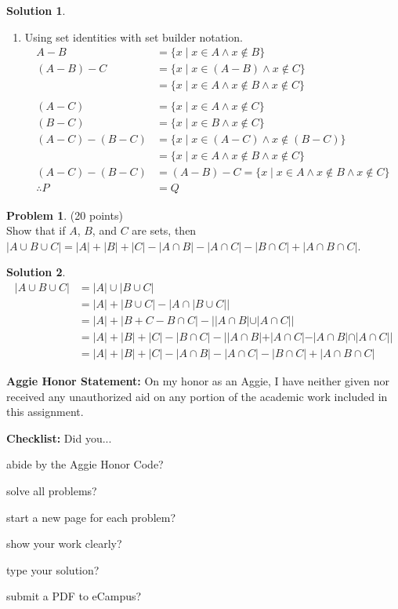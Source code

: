 \documentclass{article}
\theoremstyle{definition}
\newtheorem{problem}{Problem}
\newtheorem*{solution}{Solution}
\newcommand{\honor}{\noindent \textbf{Aggie Honor Statement: }On my honor as an Aggie, I have neither
  given nor received any unauthorized aid on any portion of the academic work included in this assignment.
}
\newcommand{\checklist}{\noindent\textbf{Checklist:}
Did you...
\begin{compactenum}
\item abide by the Aggie Honor Code?
\item solve all problems?
\item start a new page for each problem?
\item show your work clearly?
\item type your solution?
\item submit a PDF to eCampus?
\end{compactenum}
}
\begin{document}
\begin{solution}
\begin{enumerate}
    \item Using set identities with set builder notation.
      \begin{equation*}
        \begin{aligned}
          A-B            & = \{x \mid x \in A \wedge x \notin B \} \\
          (A-B) - C      & = \{x \mid x \in (A-B) \wedge x \notin C\} \\
                         & = \{x \mid x \in A \wedge x \notin B \wedge x \notin C \} \\ \ \\
          (A-C)          & = \{x \mid x \in A \wedge x \notin C \} \\
          (B-C)          & = \{x \mid x \in B \wedge x \notin C \} \\
          (A-C) - (B-C)  & = \{x \mid x \in (A-C) \wedge x \notin (B-C) \} \\
                         & = \{x \mid x \in A \wedge x \notin B \wedge x \notin C \} \\
          (A-C)-(B-C)    & = (A-B)-C = \{x \mid x \in A \wedge x \notin B \wedge x \notin C \}\\
          \therefore   P & = Q
        \end{aligned}
      \end{equation*}
  \end{enumerate}

\end{solution}

\newpage

\begin{problem} (20 points)\\
Show that if $A$, $B$, and $C$ are sets, then $|A \cup B \cup C| = |A| + |B| + |C| - |A \cap B| - |A \cap C| - |B \cap C| + |A \cap B \cap C|$.
\end{problem}

\begin{solution}
  \begin{equation*}
    \begin{aligned}
      |A \cup B \cup C| & = |A| \cup |B \cup C| \\
      & = |A| + |B \cup C| - |A \cap |B \cup C|| \\
      & = |A| + |B + C - B \cap C| - ||A \cap B| \cup |A \cap C|| \\
      & = |A| + |B| + |C| - |B \cap C| - ||A \cap B| + |A \cap C| - |A \cap B| \cap |A \cap C|| \\
      & = |A| + |B| + |C| - |A \cap B| - |A \cap C| - |B \cap C| + |A \cap B \cap C|
    \end{aligned}
  \end{equation*}
\end{solution}
\newpage



\bigskip
\honor

\bigskip
\checklist
\end{document}
